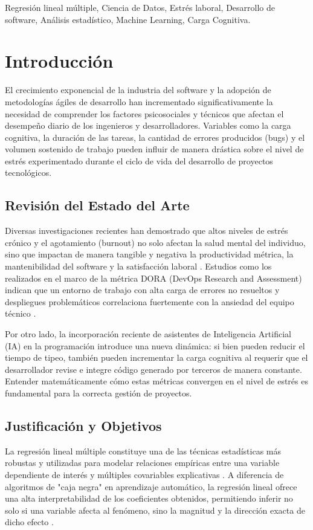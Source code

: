 \documentclass[conference]{IEEEtran}
\begin{document}
\begin{IEEEkeywords}
Regresión lineal múltiple, Ciencia de Datos, Estrés laboral, Desarrollo de software, Análisis estadístico, Machine Learning, Carga Cognitiva.
\end{IEEEkeywords}

\section{Introducción}

El crecimiento exponencial de la industria del software y la adopción de metodologías ágiles de desarrollo han incrementado significativamente la necesidad de comprender los factores psicosociales y técnicos que afectan el desempeño diario de los ingenieros y desarrolladores. Variables como la carga cognitiva, la duración de las tareas, la cantidad de errores producidos (bugs) y el volumen sostenido de trabajo pueden influir de manera drástica sobre el nivel de estrés experimentado durante el ciclo de vida del desarrollo de proyectos tecnológicos. 

\subsection{Revisión del Estado del Arte}
Diversas investigaciones recientes han demostrado que altos niveles de estrés crónico y el agotamiento (burnout) no solo afectan la salud mental del individuo, sino que impactan de manera tangible y negativa la productividad métrica, la mantenibilidad del software y la satisfacción laboral \cite{softwarestress}. Estudios como los realizados en el marco de la métrica DORA (DevOps Research and Assessment) indican que un entorno de trabajo con alta carga de errores no resueltos y despliegues problemáticos correlaciona fuertemente con la ansiedad del equipo técnico \cite{developerproductivity}. 

Por otro lado, la incorporación reciente de asistentes de Inteligencia Artificial (IA) en la programación introduce una nueva dinámica: si bien pueden reducir el tiempo de tipeo, también pueden incrementar la carga cognitiva al requerir que el desarrollador revise e integre código generado por terceros de manera constante. Entender matemáticamente cómo estas métricas convergen en el nivel de estrés es fundamental para la correcta gestión de proyectos.

\subsection{Justificación y Objetivos}
La regresión lineal múltiple constituye una de las técnicas estadísticas más robustas y utilizadas para modelar relaciones empíricas entre una variable dependiente de interés y múltiples covariables explicativas \cite{montgomery}. A diferencia de algoritmos de "caja negra" en aprendizaje automático, la regresión lineal ofrece una alta interpretabilidad de los coeficientes obtenidos, permitiendo inferir no solo si una variable afecta al fenómeno, sino la magnitud y la dirección exacta de dicho efecto \cite{james}.
\end{document}
